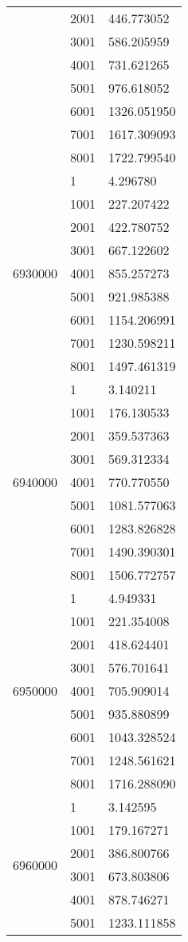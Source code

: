 \begin{table}[htb!]
\begin{tabular}{lll}
 & 2001 & 446.773052 \\
 & 3001 & 586.205959 \\
 & 4001 & 731.621265 \\
 & 5001 & 976.618052 \\
 & 6001 & 1326.051950 \\
 & 7001 & 1617.309093 \\
 & 8001 & 1722.799540 \\
\multirow[c]{9}{*}{6930000} & 1 & 4.296780 \\
 & 1001 & 227.207422 \\
 & 2001 & 422.780752 \\
 & 3001 & 667.122602 \\
 & 4001 & 855.257273 \\
 & 5001 & 921.985388 \\
 & 6001 & 1154.206991 \\
 & 7001 & 1230.598211 \\
 & 8001 & 1497.461319 \\
\multirow[c]{9}{*}{6940000} & 1 & 3.140211 \\
 & 1001 & 176.130533 \\
 & 2001 & 359.537363 \\
 & 3001 & 569.312334 \\
 & 4001 & 770.770550 \\
 & 5001 & 1081.577063 \\
 & 6001 & 1283.826828 \\
 & 7001 & 1490.390301 \\
 & 8001 & 1506.772757 \\
\multirow[c]{9}{*}{6950000} & 1 & 4.949331 \\
 & 1001 & 221.354008 \\
 & 2001 & 418.624401 \\
 & 3001 & 576.701641 \\
 & 4001 & 705.909014 \\
 & 5001 & 935.880899 \\
 & 6001 & 1043.328524 \\
 & 7001 & 1248.561621 \\
 & 8001 & 1716.288090 \\
\multirow[c]{9}{*}{6960000} & 1 & 3.142595 \\
 & 1001 & 179.167271 \\
 & 2001 & 386.800766 \\
 & 3001 & 673.803806 \\
 & 4001 & 878.746271 \\
 & 5001 & 1233.111858 \\

\end{tabular}
\end{table}
